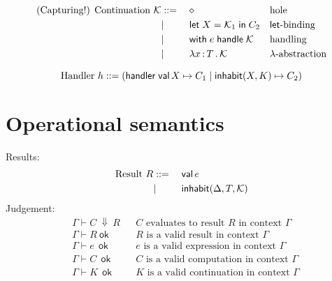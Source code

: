 \documentclass{article}
\newcommand{\bnf}{\mathrel{{:}{:}{=}}}
\newcommand{\bnfor}{|}
\newcommand{\x}{x}     %
\newcommand{\C}{C}     %
\newcommand{\K}{K}     %
\newcommand{\X}{X}     %
\newcommand{\e}{e}     %
\newcommand{\rgn}{r}   %
\newcommand{\h}{h}     %
\newcommand{\T}{T}     %
\newcommand{\val}{\mathsf{val}\,} %
\newcommand{\letin}[1]{\mathsf{let}\; #1 \;\mathsf{in}\;} %
\newcommand{\inhabitPat}[2]{\mathsf{inhabit}(#1, #2)} %
\newcommand{\inhabit}[3]{\mathsf{inhabit}(#1, #2, #3)} %
\newcommand{\withhandle}[1]{\mathsf{with}\;#1\;\mathsf{handle}\;} %
\newcommand{\abs}[1]{\mathsf{abs}\;#1\;\mathsf{in}\;} %
\newcommand{\lam}[2]{\lambda #1 \,{:}\, #2 \,.\,} %
\newcommand{\handler}[5]{\mathsf{handler}\; \val #1 \mapsto #2 \mid \inhabitPat{#3}{#4} \mapsto #5}
\newcommand{\cont}{{\cal K}}     %
\newcommand{\hole}{\diamond}
\newcommand{\G}{\Gamma}
\newcommand{\D}{\Delta}
\newcommand{\evalto}[3][\G]{#1 \vdash #2 \ \Downarrow\  #3}
\newcommand{\resultok}[2][\G]{#1 \vdash #2 \ \mathsf{ok}}
\newcommand{\eok}[2][\G]{#1 \vdash #2 \ \ \mathsf{ok}}
\newcommand{\cok}[2][\G]{#1 \vdash #2 \ \ \mathsf{ok}}
\newcommand{\kok}[2][\G]{#1 \vdash #2 \ \ \mathsf{ok}}
\newcommand{\typicalhandler}{\handler{\X}{\C_1}{\X}{\K}{\C_2}}
\begin{document}
%
\begin{equation*}
  \text{(Capturing!) Continuation $\cont$}
  \begin{aligned}[t]
    &\bnf   {} && \hole                && \text{hole} \\
    &\bnfor {} && \letin{\X = \cont_1} \C_2  && \text{$\mathsf{let}$-binding} \\
    &\bnfor {} && \withhandle{\e} \cont && \text{handling} \\
    &\bnfor {} && \lam{\x}{\T} \cont   && \text{$\lambda$-abstraction} \\
  \end{aligned}
\end{equation*}

%
\begin{equation*}
  \text{Handler $\h$}
  \bnf (\typicalhandler)\\
\end{equation*}



\section{Operational semantics}
\label{sec:oper-semant}

Results:
%
\begin{equation*}
  \text{Result $R$}
  \begin{aligned}[t]
    &\bnf   {} && \val \e \\
    &\bnfor {} && \inhabit{\D}{\T}{\cont} \\
  \end{aligned}
\end{equation*}
%
Judgement:
%
\begin{align*}
  &\evalto[\G]{C}{R} &&\text{$C$ evaluates to result $R$ in context $\G$} \\
  &\resultok[\G]{R}  &&\text{$R$ is a valid result in context $\G$} \\
  &\eok[\G]{\e} &&\text{$\e$ is a valid expression in context $\G$} \\
  &\cok[\G]{\C} &&\text{$\C$ is a valid computation in context $\G$} \\
  &\kok[\G]{\K} &&\text{$\K$ is a valid continuation in context $\G$} \\
\end{align*}
%
\end{document}
